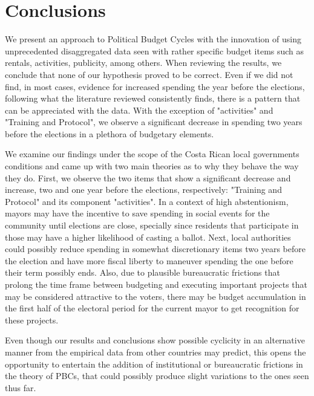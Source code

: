 \section{Conclusions}\label{sec:conclusions}

We present an approach to Political Budget Cycles with the innovation of using unprecedented disaggregated data seen with rather specific budget items such as rentals, activities, publicity, among others. When reviewing the results, we conclude that none of our hypothesis proved to be correct. Even if we did not find, in most cases, evidence for increased spending the year before the elections, following what the literature reviewed consistently finds, there is a pattern that can be appreciated with the data. With the exception of "activities" and "Training and Protocol", we observe a significant decrease in spending two years before the elections in a plethora of budgetary elements. 

We examine our findings under the scope of the Costa Rican local governments conditions and came up with two main theories as to why they behave the way they do. First, we observe the two items that show a significant decrease and increase, two and one year before the elections, respectively: "Training and Protocol" and its component "activities". In a context of high abstentionism, mayors may have the incentive to save spending in social events for the community until elections are close, specially since residents that participate in those may have a higher likelihood of casting a ballot. Next, local authorities could possibly reduce spending in somewhat discretionary items two years before the election and have more fiscal liberty to maneuver spending the one before their term possibly ends. Also, due to plausible bureaucratic frictions that prolong the time frame between budgeting and executing important projects that may be considered attractive to the voters, there may be budget accumulation in the first half of the electoral period for the current mayor to get recognition for these projects. 

Even though our results and conclusions show possible cyclicity in an alternative manner from the empirical data from other countries may predict, this opens the opportunity to entertain the addition of institutional or bureaucratic frictions in the theory of PBCs, that could possibly produce slight variations to the ones seen thus far. 